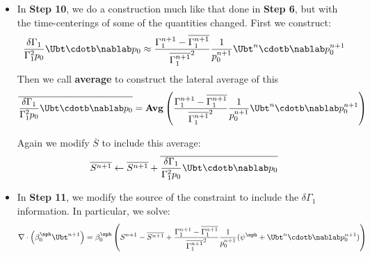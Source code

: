 \begin{itemize}
\item In {\bf Step 10}, we do a construction much like that done in {\bf Step 6},
but with the time-centerings of some of the quantities changed.
First we construct:
\begin{equation}
\frac{\delta \Gamma_1}{\Gamma_1^2 p_0} \Ubt \cdotb \nablab p_0 \approx
   \frac{\Gamma_1^{n+1} - \overline{\Gamma_1^{n+1}}}
         {{\overline{\Gamma_1^{n+1}}}^2} \frac{1}{p_0^{n+1}} \Ubt^n \cdotb \nablab p_0^{n+1}
\end{equation}
Then we call {\bf average} to construct the lateral average of this
\begin{equation}
\overline{\frac{\delta \Gamma_1}{\Gamma_1^2 p_0} \Ubt \cdotb \nablab p_0} = 
   \mathbf{Avg} \left (\frac{\Gamma_1^{n+1} - \overline{\Gamma_1^{n+1}}}
         {{\overline{\Gamma_1^{n+1}}}^2} \frac{1}{p_0^{n+1}} \Ubt^n \cdotb \nablab p_0^{n+1} \right )
\end{equation}

Again we modify $\overline{S}$ to include this average:
\begin{equation}
\overline{S^{n+1}} \leftarrow \overline{S^{n+1}} + 
   \overline{\frac{\delta \Gamma_1}{\Gamma_1^2 p_0} \Ubt \cdotb \nablab p_0} 
\end{equation}

\item In {\bf Step 11}, we modify the source of the constraint to include the
$\delta \Gamma_1$ information.  In particular, we solve:
\begin{equation}
\nabla \cdot \left(\beta_0^{\nph} \Ubt^{n+1} \right) 
= \beta_0^{\nph} \left(S^{n+1} - \overline{S^{n+1}} +
   \frac{\Gamma_1^{n+1} - \overline{\Gamma_1^{n+1}}} 
         {{\overline{\Gamma_1^{n+1}}}^2} \frac{1}{p_0^{n+1}}
         (\psi^{\nph} + \Ubt^n \cdotb \nablab p_0^{n+1})
\right)
\end{equation}


\end{itemize}



